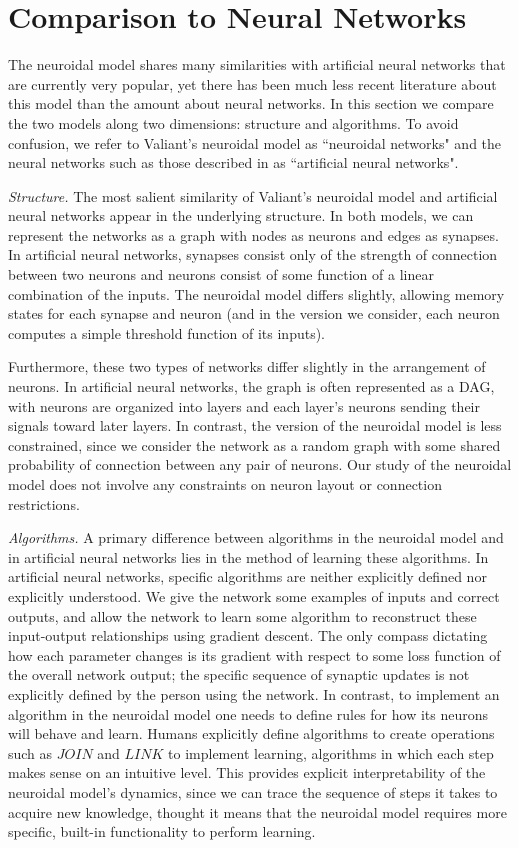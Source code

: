 \documentclass[letterpaper, 12pt]{article}
\begin{document}
\section{Comparison to Neural Networks}
The neuroidal model shares many similarities with artificial neural networks that are currently very popular, yet there has been much less recent literature about this model than the amount about neural networks. In this section we compare the two models along two dimensions: structure and algorithms. To avoid confusion, we refer to Valiant's neuroidal model as ``neuroidal networks" and the neural networks such as those described in \cite{nielsen_neural_2015} as ``artificial neural networks". 

{\it Structure.}  The most salient similarity of Valiant's neuroidal model and artificial neural networks appear in the underlying structure. In both models, we can represent the networks as a graph with nodes as neurons and edges as synapses. In artificial neural networks, synapses consist only of the strength of connection between two neurons and neurons consist of some function of a linear combination of the inputs. The neuroidal model differs slightly, allowing memory states for each synapse and neuron (and in the version we consider, each neuron computes a simple threshold function of its inputs).

Furthermore, these two types of networks differ slightly in the arrangement of neurons. In artificial neural networks, the graph is often represented as a DAG, with neurons are organized into layers and each layer's neurons sending their signals toward later layers. In contrast, the version of the neuroidal model is less constrained, since we consider the network as a random graph with some shared probability of connection between any pair of neurons. Our study of the neuroidal model does not involve any constraints on neuron layout or connection restrictions.

{\it Algorithms.} A primary difference between algorithms in the neuroidal model and in artificial neural networks lies in the method of learning these algorithms. In artificial neural networks, specific algorithms are neither explicitly defined nor explicitly understood. We give the network some examples of inputs and correct outputs, and allow the network to learn some algorithm to reconstruct these input-output relationships using gradient descent. The only compass dictating how each parameter changes is its gradient with respect to some loss function of the overall network output; the specific sequence of synaptic updates is not explicitly defined by the person using the network. In contrast, to implement an algorithm in the neuroidal model one needs to define rules for how its neurons will behave and learn. Humans explicitly define algorithms to create operations such as $JOIN$ and $LINK$ to implement learning, algorithms in which each step makes sense on an intuitive level. This provides explicit interpretability of the neuroidal model's dynamics, since we can trace the sequence of steps it takes to acquire new knowledge, thought it means that the neuroidal model requires more specific, built-in functionality to perform learning.
\end{document}
